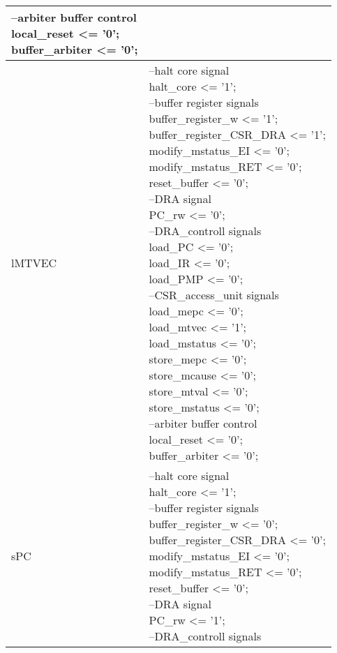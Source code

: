 \begin{longtable}{| p{} | p{} |}
{		--arbiter buffer control\\
		local\_reset <= '0';\\
		buffer\_arbiter <= '0';} \\
	\hline
	lMTVEC & \makecell{--halt core signal\\
		halt\_core <= '1';\\
		--buffer register signals\\
		buffer\_register\_w <= '1';\\
		buffer\_register\_CSR\_DRA <= '1';\\
		modify\_mstatus\_EI <= '0';\\
		modify\_mstatus\_RET <= '0';\\
		reset\_buffer <= '0';\\
		--DRA signal\\
		PC\_rw <= '0';\\
		--DRA\_controll signals\\
		load\_PC <= '0';\\
		load\_IR <= '0';\\
		load\_PMP <= '0';\\
		--CSR\_access\_unit signals\\
		load\_mepc <= '0';\\
		load\_mtvec <= '1';\\
		load\_mstatus <= '0';\\
		store\_mepc <= '0';\\
		store\_mcause <= '0';\\
		store\_mtval <= '0';\\
		store\_mstatus <= '0';\\
		--arbiter buffer control\\
		local\_reset <= '0';\\
		buffer\_arbiter <= '0';} \\
	\hline
	sPC & \makecell{--halt core signal\\
		halt\_core <= '1';\\
		--buffer register signals\\
		buffer\_register\_w <= '0';\\
		buffer\_register\_CSR\_DRA <= '0';\\
		modify\_mstatus\_EI <= '0';\\
		modify\_mstatus\_RET <= '0';\\
		reset\_buffer <= '0';\\
		--DRA signal\\
		PC\_rw <= '1';\\
		--DRA\_controll signals\\
}
\end{longtable}
